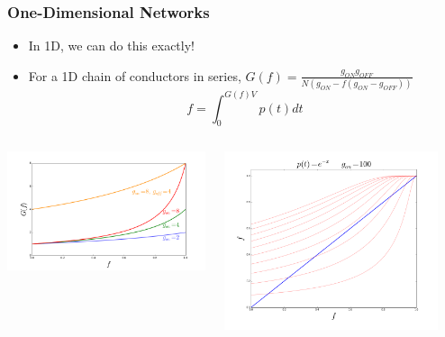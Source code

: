 \documentclass[mathserif]{beamer}
\begin{document}
\begin{frame}
\frametitle{One-Dimensional Networks}
\begin{itemize}
\item In 1D, we can do this exactly!
\item For a 1D chain of conductors in series, $G(f) = \frac{g_{ON}g_{OFF}}{N(g_{ON} - f (g_{ON} - g_{OFF}))}$
$$f = \int_0^{G(f)V} p(t) dt$$
\end{itemize}
\begin{columns}
\centering
\includegraphics[width=\textwidth]{1D_Network_Cond.png}

\centering
\includegraphics[width=0.9\textwidth]{SC_1D_ON100_expon.png}

\end{columns}
\end{frame}
\end{document}
